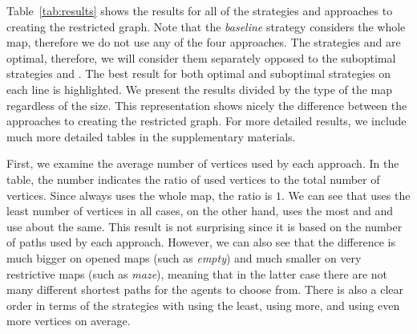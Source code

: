 %
Table~\ref{tab:results} shows the results for all of the strategies and approaches to creating the restricted graph. Note that the \emph{baseline} strategy \ssb{} considers the whole map, therefore we do not use any of the four approaches. The strategies \ssb{} and \ssp{} are optimal, therefore, we will consider them separately opposed to the suboptimal strategies \ssc{} and \ssm{}. The best result for both optimal and suboptimal strategies on each line is highlighted. We present the results divided by the type of the map regardless of the size. This representation shows nicely the difference between the approaches to creating the restricted graph. For more detailed results, we include much more detailed tables in the supplementary materials.

First, we examine the average number of vertices used by each approach. In the table, the number indicates the ratio of used vertices to the total number of vertices. Since \ssb{} always uses the whole map, the ratio is $1$. We can see that \pss{} uses the least number of vertices in all cases, on the other hand, \psa{} uses the most and \psd{} and \psr{} use about the same. This result is not surprising since it is based on the number of paths used by each approach. However, we can also see that the difference is much bigger on opened maps (such as \emph{empty}) and much smaller on very restrictive maps (such as \emph{maze}), meaning that in the latter case there are not many different shortest paths for the agents to choose from. There is also a clear order in terms of the strategies with \ssp{} using the least, \ssc{} using more, and \ssm{} using even more vertices on average.

